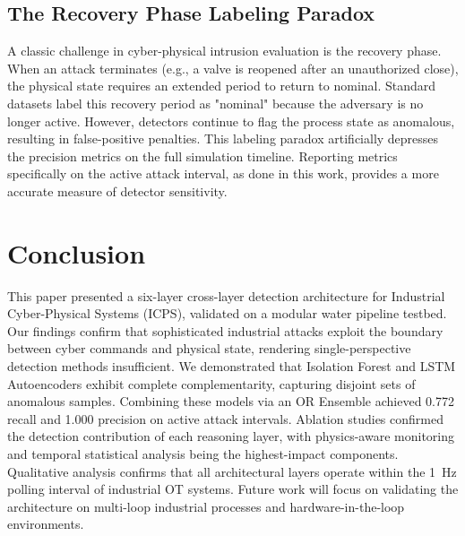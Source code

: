 \documentclass[journal,twoside,web]{ieeecolor}
\begin{document}
\subsection{The Recovery Phase Labeling Paradox}
A classic challenge in cyber-physical intrusion evaluation is the recovery phase. When an attack terminates (e.g., a valve is reopened after an unauthorized close), the physical state requires an extended period to return to nominal. Standard datasets label this recovery period as "nominal" because the adversary is no longer active. However, detectors continue to flag the process state as anomalous, resulting in false-positive penalties. This labeling paradox artificially depresses the precision metrics on the full simulation timeline. Reporting metrics specifically on the active attack interval, as done in this work, provides a more accurate measure of detector sensitivity.

\section{Conclusion} \label{sec:conclusion}

This paper presented a six-layer cross-layer detection architecture for Industrial Cyber-Physical Systems (ICPS), validated on a modular water pipeline testbed. Our findings confirm that sophisticated industrial attacks exploit the boundary between cyber commands and physical state, rendering single-perspective detection methods insufficient. We demonstrated that Isolation Forest and LSTM Autoencoders exhibit complete complementarity, capturing disjoint sets of anomalous samples. Combining these models via an OR Ensemble achieved 0.772 recall and 1.000 precision on active attack intervals. Ablation studies confirmed the detection contribution of each reasoning layer, with physics-aware monitoring and temporal statistical analysis being the highest-impact components. Qualitative analysis confirms that all architectural layers operate within the 1~Hz polling interval of industrial OT systems. Future work will focus on validating the architecture on multi-loop industrial processes and hardware-in-the-loop environments.



\end{document}
